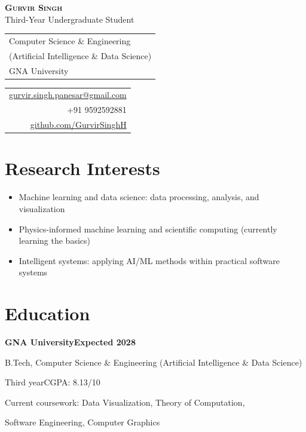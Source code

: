 \documentclass[11pt]{article}
\newcommand{\entry}[2]{\hspace*{6pt}\textbf{#1}\hfill\textbf{#2}\par}
\newcommand{\detail}[2]{\hspace*{27pt}#1\hfill#2\par}
\begin{document}
\begin{center}
  {\LARGE\bfseries\scshape Gurvir Singh}\\[2pt]
  Third-Year Undergraduate Student
\end{center}
\vspace{-4pt}

\noindent
\hspace*{6pt}%
\begin{tabular}[t]{@{}l@{}}
  Computer Science \& Engineering\\
  (Artificial Intelligence \& Data Science)\\
  GNA University
\end{tabular}%
\hfill
\begin{tabular}[t]{@{}r@{}}
  \href{mailto:gurvir.singh.panesar@gmail.com}{gurvir.singh.panesar@gmail.com}\\
  +91 9592592881\\
  \href{https://github.com/GurvirSinghH}{github.com/GurvirSinghH}
\end{tabular}%
\hspace*{3pt}

\section{Research Interests}
\begin{itemize}
  \item Machine learning and data science: data processing, analysis, and visualization
  \item Physics-informed machine learning and scientific computing (currently learning the basics)
  \item Intelligent systems: applying AI/ML methods within practical software systems
\end{itemize}

\section{Education}
\entry{GNA University}{Expected 2028}
\detail{B.Tech, Computer Science \& Engineering (Artificial Intelligence \& Data Science)}{}
\detail{Third year}{CGPA: 8.13/10}
\detail{Current coursework: Data Visualization, Theory of Computation,}{}
\detail{\phantom{Current coursework: }Software Engineering, Computer Graphics}{}
\end{document}
